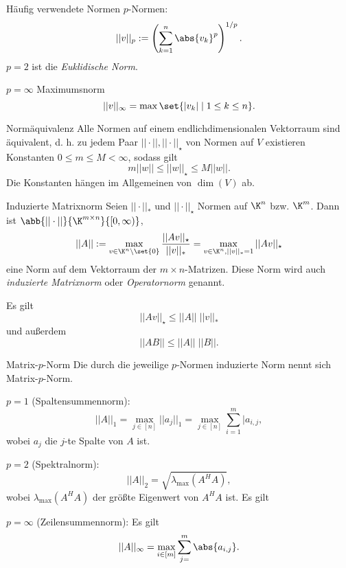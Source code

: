 \begin{karte}{Häufig verwendete Normen}
    \( p \)-Normen:
    \[ ||v||_p := \left( \sum_{k=1}^n \abs{v_k}^p \right)^{1/p}. \]
    \( p = 2 \) ist die \textit{Euklidische Norm}.

    \( p = \infty \) Maximumsnorm
    \[ ||v||_\infty = \max\set{|v_k| \;|\; 1 \leq k \leq n}. \]
\end{karte}

\begin{karte}{Normäquivalenz}
    Alle Normen auf einem endlichdimensionalen Vektorraum sind äquivalent, d. h. 
    zu jedem Paar \( || \cdot ||, || \cdot ||_\star \) von Normen auf \(V\) 
    existieren Konstanten \( 0 \leq m \leq M < \infty \), sodass gilt 
    \[ m ||w|| \leq ||w||_\star \leq M||w||. \]
    Die Konstanten hängen im Allgemeinen von \( \dim(V) \) ab.
\end{karte}

\begin{karte}{Induzierte Matrixnorm}
    Seien \( ||\cdot||_* \) und \( ||\cdot||_\star \) Normen auf 
    \( \K^n \) bzw. \( \K^m \). Dann ist \( \abb{|| \cdot||}{\K^{m\times n}}{[0,\infty)} \), 
    \[ ||A|| := \max_{v\in\K^n\setminus\set{0}} \frac{||Av||_\star}{||v||_*} = \max_{v\in\K^n, ||v||_* = 1} ||Av||_\star \]
    eine Norm auf dem Vektorraum der \( m\times n \)-Matrizen. Diese Norm wird auch \textit{induzierte 
    Matrixnorm} oder \textit{Operatornorm} genannt.

    Es gilt 
    \[ ||Av||_\star \leq ||A|| \; ||v||_* \]
    und außerdem 
    \[ ||AB|| \leq ||A|| \; ||B||. \]
\end{karte}

\begin{karte}{Matrix-\(p\)-Norm}
    Die durch die jeweilige \(p\)-Normen induzierte Norm nennt sich Matrix-\(p\)-Norm.
    
    \( p=1 \) (Spaltensummennorm): 
    \[ ||A||_1 = \max_{j\in[n]} ||a_j||_1 = \max_{j\in[n]} \sum_{i=1}^m |a_{i,j},  \]
    wobei \( a_j \) die \(j\)-te Spalte von \(A\) ist.

    \( p=2 \) (Spektralnorm):
    \[ ||A||_2 = \sqrt{\lambda_{\max}(A^H A)}, \]
    wobei \( \lambda_{\max}(A^H A) \) der größte Eigenwert von \( A^H A \) ist.
    Es gilt 

    \( p=\infty \) (Zeilensummennorm):
    Es gilt 
    \[ ||A||_\infty = \max_{i\in[m]} \sum_{j=}^m \abs{a_{i,j}}. \]
\end{karte}

